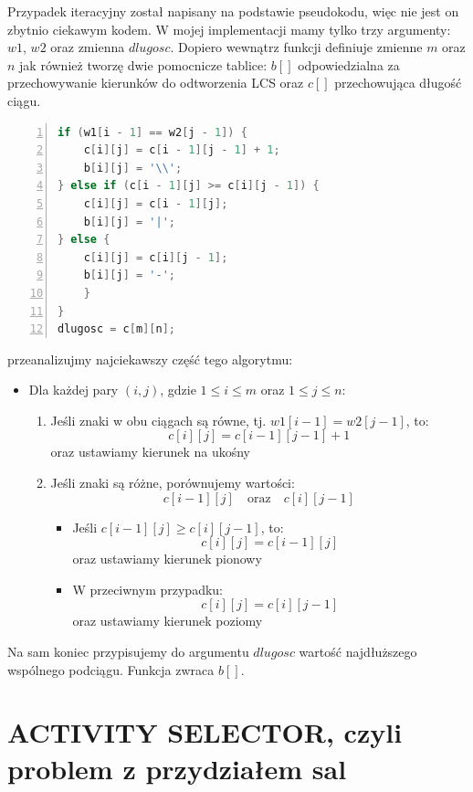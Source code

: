 \documentclass{article}
\begin{document}
\large{Przypadek iteracyjny został napisany na podstawie pseudokodu, więc nie jest on zbytnio ciekawym kodem. W mojej implementacji mamy tylko trzy argumenty: $w1$, $w2$ oraz zmienna $dlugosc$. Dopiero wewnątrz funkcji definiuje zmienne $m$ oraz $n$ jak również tworzę dwie pomocnicze tablice: $b[]$ odpowiedzialna za przechowywanie kierunków do odtworzenia LCS oraz $c[]$ przechowująca długość ciągu.}

\begin{lstlisting}[language=C++, caption={Kod funkcji znajdowania nadłuższego wspólnego podciągu w wersji iteracyjnej}, numbers=left, frame=single, xleftmargin=20pt]
if (w1[i - 1] == w2[j - 1]) {
	c[i][j] = c[i - 1][j - 1] + 1;
	b[i][j] = '\\';
} else if (c[i - 1][j] >= c[i][j - 1]) {
	c[i][j] = c[i - 1][j];
	b[i][j] = '|';
} else {
	c[i][j] = c[i][j - 1];
	b[i][j] = '-';
	}
}
dlugosc = c[m][n];
\end{lstlisting}

\large{przeanalizujmy najciekawszy część tego algorytmu:}

\begin{itemize}
	\item Dla każdej pary $(i, j)$, gdzie $1 \leq i \leq m$ oraz $1 \leq j \leq n$:
	\begin{enumerate}
		\item Jeśli znaki w obu ciągach są równe, tj. $w1[i-1] = w2[j-1]$, to:
		\[
		c[i][j] = c[i-1][j-1] + 1
		\]
		oraz ustawiamy kierunek na ukośny
		\item Jeśli znaki są różne, porównujemy wartości:
		\[
		c[i-1][j] \quad \text{oraz} \quad c[i][j-1]
		\]
		\begin{itemize}
			\item Jeśli $c[i-1][j] \geq c[i][j-1]$, to:
			\[
			c[i][j] = c[i-1][j]
			\]
			oraz ustawiamy kierunek pionowy
			\item W przeciwnym przypadku:
			\[
			c[i][j] = c[i][j-1]
			\]
			oraz ustawiamy kierunek poziomy
		\end{itemize}
	\end{enumerate}
\end{itemize}

\large{Na sam koniec przypisujemy do argumentu $dlugosc$ wartość najdłuższego wspólnego podciągu. Funkcja zwraca $b[]$.}

\section{ACTIVITY SELECTOR, czyli problem z przydziałem sal}
\end{document}
